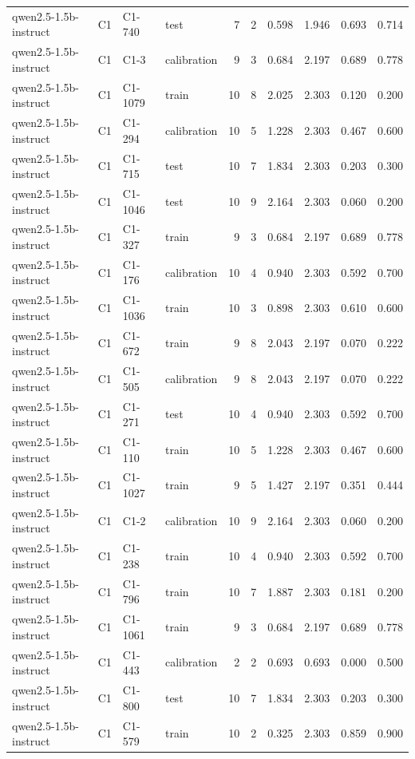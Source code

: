 \begin{table}
\begin{tabular}{llllrrrrrr}
qwen2.5-1.5b-instruct & C1 & C1-740 & test & 7 & 2 & 0.598 & 1.946 & 0.693 & 0.714 \\
qwen2.5-1.5b-instruct & C1 & C1-3 & calibration & 9 & 3 & 0.684 & 2.197 & 0.689 & 0.778 \\
qwen2.5-1.5b-instruct & C1 & C1-1079 & train & 10 & 8 & 2.025 & 2.303 & 0.120 & 0.200 \\
qwen2.5-1.5b-instruct & C1 & C1-294 & calibration & 10 & 5 & 1.228 & 2.303 & 0.467 & 0.600 \\
qwen2.5-1.5b-instruct & C1 & C1-715 & test & 10 & 7 & 1.834 & 2.303 & 0.203 & 0.300 \\
qwen2.5-1.5b-instruct & C1 & C1-1046 & test & 10 & 9 & 2.164 & 2.303 & 0.060 & 0.200 \\
qwen2.5-1.5b-instruct & C1 & C1-327 & train & 9 & 3 & 0.684 & 2.197 & 0.689 & 0.778 \\
qwen2.5-1.5b-instruct & C1 & C1-176 & calibration & 10 & 4 & 0.940 & 2.303 & 0.592 & 0.700 \\
qwen2.5-1.5b-instruct & C1 & C1-1036 & train & 10 & 3 & 0.898 & 2.303 & 0.610 & 0.600 \\
qwen2.5-1.5b-instruct & C1 & C1-672 & train & 9 & 8 & 2.043 & 2.197 & 0.070 & 0.222 \\
qwen2.5-1.5b-instruct & C1 & C1-505 & calibration & 9 & 8 & 2.043 & 2.197 & 0.070 & 0.222 \\
qwen2.5-1.5b-instruct & C1 & C1-271 & test & 10 & 4 & 0.940 & 2.303 & 0.592 & 0.700 \\
qwen2.5-1.5b-instruct & C1 & C1-110 & train & 10 & 5 & 1.228 & 2.303 & 0.467 & 0.600 \\
qwen2.5-1.5b-instruct & C1 & C1-1027 & train & 9 & 5 & 1.427 & 2.197 & 0.351 & 0.444 \\
qwen2.5-1.5b-instruct & C1 & C1-2 & calibration & 10 & 9 & 2.164 & 2.303 & 0.060 & 0.200 \\
qwen2.5-1.5b-instruct & C1 & C1-238 & train & 10 & 4 & 0.940 & 2.303 & 0.592 & 0.700 \\
qwen2.5-1.5b-instruct & C1 & C1-796 & train & 10 & 7 & 1.887 & 2.303 & 0.181 & 0.200 \\
qwen2.5-1.5b-instruct & C1 & C1-1061 & train & 9 & 3 & 0.684 & 2.197 & 0.689 & 0.778 \\
qwen2.5-1.5b-instruct & C1 & C1-443 & calibration & 2 & 2 & 0.693 & 0.693 & 0.000 & 0.500 \\
qwen2.5-1.5b-instruct & C1 & C1-800 & test & 10 & 7 & 1.834 & 2.303 & 0.203 & 0.300 \\
qwen2.5-1.5b-instruct & C1 & C1-579 & train & 10 & 2 & 0.325 & 2.303 & 0.859 & 0.900 \\

\end{tabular}
\end{table}
